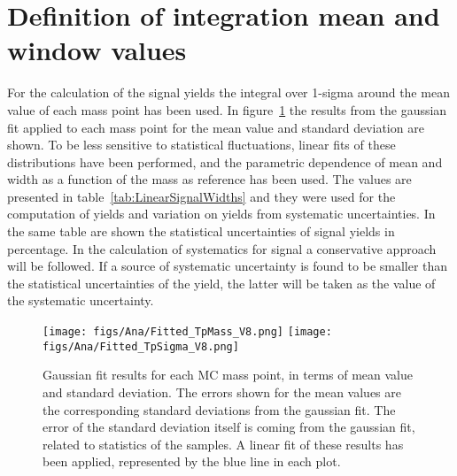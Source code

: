 \section{Definition of integration mean and window values}
\label{sec:DefSigma}

For the calculation of the signal yields the integral over 1-sigma around the mean value of each mass point has been used. In figure~\ref{fig:LinearFitMeanSigma} the results from the gaussian fit applied to each mass point for the mean value and standard deviation are shown. To be less sensitive to statistical fluctuations, linear fits of these distributions have been performed, and the parametric dependence of mean and width as a function of the mass as reference has been used. The values are presented in table~\ref{tab:LinearSignalWidths} and they were used for the computation of yields and variation on yields from systematic uncertainties. In the same table are shown the statistical uncertainties of signal yields in percentage. In the calculation of systematics for signal a conservative approach will be followed. If a source of systematic uncertainty is found to be smaller than the statistical uncertainties of the yield, the latter will be taken as the value of the systematic uncertainty.

\begin{figure}[!Hhtbp]
  \begin{center}
    \texttt{[image: figs/Ana/Fitted\_TpMass\_V8.png]}
    \texttt{[image: figs/Ana/Fitted\_TpSigma\_V8.png]}
    \caption{Gaussian fit results for each MC mass point, in terms of mean value and standard deviation. The errors shown for the mean values are the corresponding standard deviations from the gaussian fit. The error of the standard deviation itself is coming from the gaussian fit, related to statistics of the samples. A linear fit of these results has been applied, represented by the blue line in each plot.}
    \label{fig:LinearFitMeanSigma}
  \end{center}
\end{figure}

